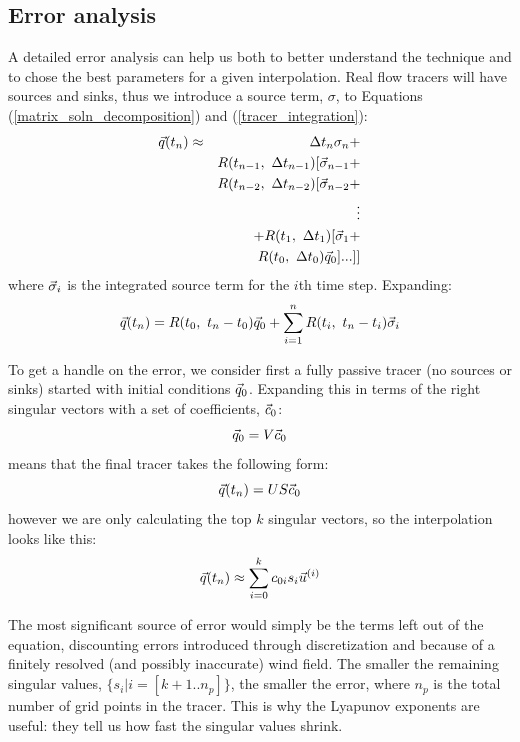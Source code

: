 \subsection{Error analysis}

A detailed error analysis can help us both to better understand the technique
and to chose the best parameters for a given interpolation.
Real flow tracers will have sources and sinks, thus we introduce a source
term, $\sigma$, to Equations (\ref{matrix_soln_decomposition})
and (\ref{tracer_integration}):
\begin{eqnarray}
	  \vec q(t_n) 
  & \approx & \Delta t_{n} \sigma_{n} + \nonumber \\
  & & R(t_{n-1}, ~ \Delta t_{n-1}) [\vec \sigma_{n-1} + \nonumber \\
  & & R(t_{n-2}, ~ \Delta t_{n-2}) [\vec \sigma_{n-2} + \nonumber \\
  & & \vdots \nonumber \\
  & & + R(t_1, ~ \Delta t_1) [\vec \sigma_1 + \nonumber \\
  & & R(t_0, ~ \Delta t_0) \vec q_0 ]...]]
\end{eqnarray}
where $\vec \sigma_i$ is the integrated source term for the $i$th time step.
Expanding:
\begin{equation}
\vec q(t_n) 
   = R(t_0,~t_n-t_0) \vec q_0 + \sum_{i=1}^{n} R(t_i,~t_n-t_i) \vec \sigma_i
  \label{sources_sinks}
\end{equation}

To get a handle on the error, we consider first a fully passive tracer 
(no sources or sinks) started with initial conditions $\vec q_0$.
Expanding this in terms of the right singular vectors with a set
of coefficients, $\vec c_0$:
\begin{equation}
	\vec q_0 = V \vec c_0
	\label{c0}
\end{equation}
means that the final tracer takes the following form:
\begin{equation}
	\vec q(t_n) = U S \vec c_0
\end{equation}
however we are only calculating the top $k$ singular vectors, so the
interpolation looks like this:
\begin{equation}
	\vec q(t_n) \approx \sum_{i=0}^k c_{0i} s_i \vec u^{(i)}
\end{equation}

The most significant source of error would simply be the terms left out of the equation,
discounting errors introduced through discretization and because of
a finitely resolved (and possibly inaccurate) wind field.
The smaller the remaining singular values, $\lbrace s_i|i=[k+1..n_p]\rbrace$,
the smaller the error, where $n_p$ is the total number of grid points in the tracer.
This is why the Lyapunov exponents are useful:
they tell us how fast the singular values shrink.

